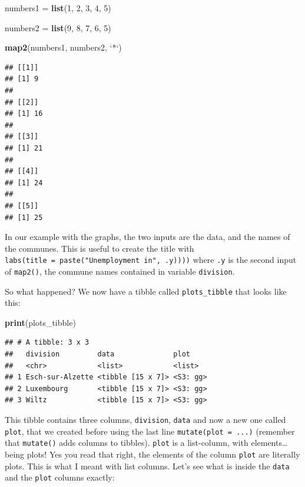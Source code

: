 \documentclass[]{gitbook}
\newenvironment{Shaded}{\begin{snugshade}}{\end{snugshade}}
\newcommand{\DataTypeTok}[1]{\textcolor[rgb]{0.13,0.29,0.53}{#1}}
\newcommand{\DecValTok}[1]{\textcolor[rgb]{0.00,0.00,0.81}{#1}}
\newcommand{\KeywordTok}[1]{\textcolor[rgb]{0.13,0.29,0.53}{\textbf{#1}}}
\newcommand{\NormalTok}[1]{#1}
\newcommand{\StringTok}[1]{\textcolor[rgb]{0.31,0.60,0.02}{#1}}
\theoremstyle{definition}
\theoremstyle{definition}
\theoremstyle{definition}
\theoremstyle{remark}
\begin{document}
\begin{Shaded}
\begin{Highlighting}[]
\NormalTok{numbers1 =}\StringTok{ }\KeywordTok{list}\NormalTok{(}\DecValTok{1}\NormalTok{, }\DecValTok{2}\NormalTok{, }\DecValTok{3}\NormalTok{, }\DecValTok{4}\NormalTok{, }\DecValTok{5}\NormalTok{)}

\NormalTok{numbers2 =}\StringTok{ }\KeywordTok{list}\NormalTok{(}\DecValTok{9}\NormalTok{, }\DecValTok{8}\NormalTok{, }\DecValTok{7}\NormalTok{, }\DecValTok{6}\NormalTok{, }\DecValTok{5}\NormalTok{)}

\KeywordTok{map2}\NormalTok{(numbers1, numbers2, }\StringTok{`}\DataTypeTok{*}\StringTok{`}\NormalTok{)}
\end{Highlighting}
\end{Shaded}

\begin{verbatim}
## [[1]]
## [1] 9
## 
## [[2]]
## [1] 16
## 
## [[3]]
## [1] 21
## 
## [[4]]
## [1] 24
## 
## [[5]]
## [1] 25
\end{verbatim}

In our example with the graphs, the two inputs are the data, and the
names of the communes. This is useful to create the title with
\texttt{labs(title\ =\ paste("Unemployment\ in",\ .y))))} where
\texttt{.y} is the second input of \texttt{map2()}, the commune names
contained in variable \texttt{division}.

So what happened? We now have a tibble called \texttt{plots\_tibble}
that looks like this:

\begin{Shaded}
\begin{Highlighting}[]
\KeywordTok{print}\NormalTok{(plots_tibble)}
\end{Highlighting}
\end{Shaded}

\begin{verbatim}
## # A tibble: 3 x 3
##   division         data              plot    
##   <chr>            <list>            <list>  
## 1 Esch-sur-Alzette <tibble [15 x 7]> <S3: gg>
## 2 Luxembourg       <tibble [15 x 7]> <S3: gg>
## 3 Wiltz            <tibble [15 x 7]> <S3: gg>
\end{verbatim}

This tibble contains three columns, \texttt{division}, \texttt{data} and
now a new one called \texttt{plot}, that we created before using the
last line \texttt{mutate(plot\ =\ ...)} (remember that \texttt{mutate()}
adds columns to tibbles). \texttt{plot} is a list-column, with
elements\ldots{} being plots! Yes you read that right, the elements of
the column \texttt{plot} are literally plots. This is what I meant with
list columns. Let's see what is inside the \texttt{data} and the
\texttt{plot} columns exactly:
\end{document}
